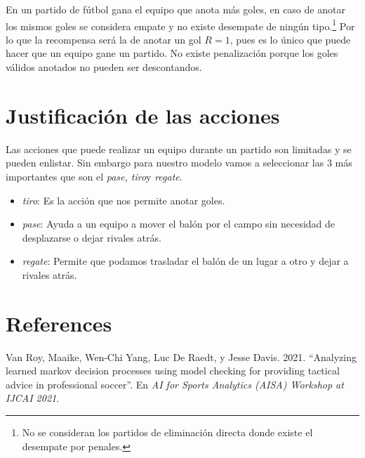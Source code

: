 \documentclass[
  us-letterpaper,
  DIV=11,
  numbers=noendperiod]{scrreprt}
\providecommand{\tightlist}{%
  \setlength{\itemsep}{0pt}\setlength{\parskip}{0pt}}\usepackage{longtable,booktabs,array}
\newlength{\cslhangindent}
\newenvironment{CSLReferences}[2] %
 {\begin{list}{}{%
  \setlength{\itemindent}{0pt}
  \setlength{\leftmargin}{0pt}
  \setlength{\parsep}{0pt}
  \ifodd #1
   \setlength{\leftmargin}{\cslhangindent}
   \setlength{\itemindent}{-1\cslhangindent}
  \fi
  \setlength{\itemsep}{#2\baselineskip}}}
 {\end{list}}
\begin{document}
En un partido de fútbol gana el equipo que anota más goles, en caso de
anotar los mismos goles se considera empate y no existe desempate de
ningún tipo.\footnote{No se consideran los partidos de eliminación
  directa donde existe el desempate por penales.} Por lo que la
recompensa será la de anotar un gol \(R=1\), pues es lo único que puede
hacer que un equipo gane un partido. No existe penalización porque los
goles válidos anotados no pueden ser descontandos.


\chapter{Justificación de las
acciones}\label{justificaciuxf3n-de-las-acciones}

Las acciones que puede realizar un equipo durante un partido son
limitadas y se pueden enlistar. Sin embargo para nuestro modelo vamos a
seleccionar las 3 más importantes que son el \emph{pase, tiro}y
\emph{regate}.

\begin{itemize}
\tightlist
\item
  \emph{tiro}: Es la acción que nos permite anotar goles.
\item
  \emph{pase}: Ayuda a un equipo a mover el balón por el campo sin
  necesidad de desplazarse o dejar rivales atrás.
\item
  \emph{regate}: Permite que podamos trasladar el balón de un lugar a
  otro y dejar a rivales atrás.
\end{itemize}


\chapter*{References}\label{references}


\label{refs}
\begin{CSLReferences}{1}{0}
Van Roy, Maaike, Wen-Chi Yang, Luc De Raedt, y Jesse Davis. 2021.
{``Analyzing learned markov decision processes using model checking for
providing tactical advice in professional soccer''}. En \emph{AI for
Sports Analytics (AISA) Workshop at IJCAI 2021}.

\end{CSLReferences}
\end{document}
